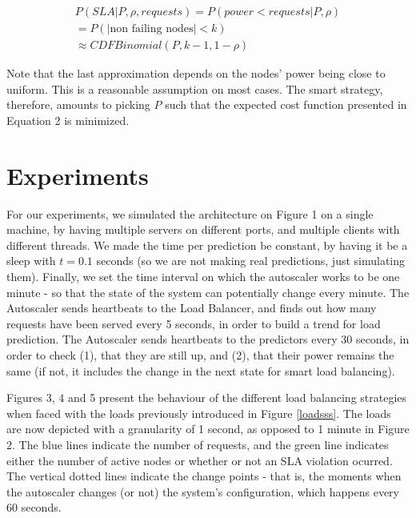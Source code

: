 \documentclass[12pt]{article}
\begin{document}
\begin{eqnarray*}
P(SLA | P, \rho, requests) = P(power < requests | P, \rho)\\
 = P(|\text{non failing nodes}| < k) \\ \approx CDF Binomial (P, k-1, 1 - \rho)
\end{eqnarray*}

Note that the last approximation depends on the nodes' power being close to
uniform. This is a reasonable assumption on most cases. The smart strategy,
therefore, amounts to picking $P$ such that the expected cost function presented
in Equation 2 is minimized.

\section{Experiments}
For our experiments, we simulated the architecture on Figure 1 on a single
machine, by having multiple servers on different ports, and multiple clients
with different threads. We made the time per prediction be constant, by having
it be a sleep with $t = 0.1$ seconds (so we are not making real predictions,
just simulating them). Finally, we set the time interval on which the autoscaler
works to be one minute - so that the state of the system can potentially change
every minute. The Autoscaler sends heartbeats to the Load Balancer, and finds
out how many requests have been served every 5 seconds, in order to build a
trend for load prediction. The Autoscaler sends heartbeats to the predictors
every 30 seconds, in order to check (1), that they are still up, and (2), that
their power remains the same (if not, it includes the change in the next state
for smart load balancing).

Figures 3, 4 and 5 present the behaviour of the different load balancing
strategies when faced with the loads previously introduced in Figure
\ref{loadsss}. The loads are now depicted with a granularity of 1 second, as
opposed to 1 minute in Figure 2. The blue lines indicate the number of requests,
and the green line indicates either the number of active nodes or whether or not
an SLA violation ocurred. The vertical dotted lines indicate the change points -
that is, the moments when the autoscaler changes (or not) the system's
configuration, which happens every 60 seconds.
\end{document}
